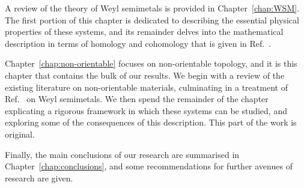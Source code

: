 A review of the theory of Weyl semimetals is provided in Chapter~\ref{chap:WSM}. The first portion of this chapter is dedicated to describing the essential physical properties of these systems, and its remainder delves into the mathematical description in terms of homology and cohomology that is given in Ref.~\cite{Mathai_math-review}.

Chapter~\ref{chap:non-orientable} focuses on non-orientable topology, and it is this chapter that contains the bulk of our results. We begin with a review of the existing literature on non-orientable materials, culminating in a treatment of Ref.~\cite{Fonseca-Vaidya_nonorientable} on Weyl semimetals. We then spend the remainder of the chapter explicating a rigorous framework in which these systems can be studied, and exploring some of the consequences of this description. This part of the work is original.

Finally, the main conclusions of our research are summarised in Chapter~\ref{chap:conclusions}, and some recommendations for further avenues of research are given.